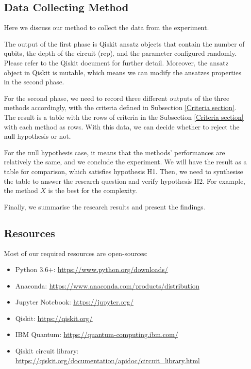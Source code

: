 \subsection{Data Collecting Method}
\label{Data Collecting Section}
Here we discuss our method to collect the data from the experiment.

The output of the first phase is Qiskit ansatz objects that contain the number of qubits, the depth of the circuit (rep), and the parameter configured randomly. Please refer to the Qiskit document for further detail.
Moreover, the ansatz object in Qiskit is mutable, which means we can modify the ansatzes properties in the second phase.

For the second phase, we need to record three different outputs of the three methods accordingly, with the criteria defined in Subsection \ref{Criteria section}.
The result is a table with the rows of criteria in the Subsection \ref{Criteria section} with each method as rows.
With this data, we can decide whether to reject the null hypothesis or not.

For the null hypothesis case, it means that the methods' performances are relatively the same, and we conclude the experiment.
We will have the result as a table for comparison, which satisfies hypothesis H1. 
Then, we need to synthesise the table to answer the research question and verify hypothesis H2. 
For example, the method $X$ is the best for the complexity.

Finally, we summarise the research results and present the findings.

\subsection{Resources}
Most of our required resources are open-sources:
\begin{itemize}
    \item Python 3.6+: \url{https://www.python.org/downloads/}
    \item Anaconda: \url{https://www.anaconda.com/products/distribution}
    \item Jupyter Notebook: \url{https://jupyter.org/}
    \item Qiskit: \url{https://qiskit.org/}
    \item IBM Quantum: \url{https://quantum-computing.ibm.com/}
    \item Qiskit circuit library: \url{https://qiskit.org/documentation/apidoc/circuit_library.html}
\end{itemize}

